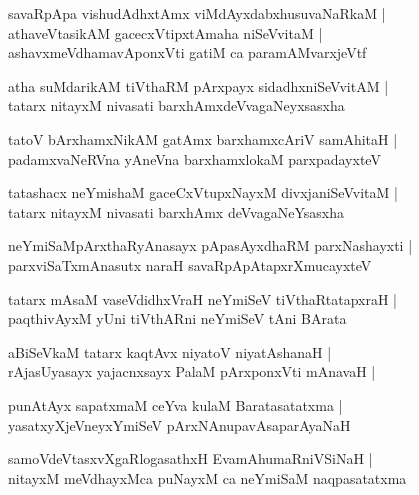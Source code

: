 \documentclass[twoside,12pt,openright]{book}
\newcounter{shloka}[chapter]
\begin{document}
\begin{shloka}
savaRpApa vishudAdhxtAmx viMdAyxdabxhusuvaNaRkaM |\\
athaveVtasikAM gacecxVtipxtAmaha niSeVvitaM |\\
ashavxmeVdhamavAponxVti gatiM  ca paramAMvarxjeVtf 
\end{shloka}

\begin{shloka}
atha suMdarikAM tiVthaRM pArxpayx sidadhxniSeVvitAM |\\
tatarx nitayxM nivasati barxhAmxdeVvagaNeyxsasxha 
\end{shloka}

\begin{shloka}
tatoV bArxhamxNikAM gatAmx barxhamxcAriV samAhitaH |\\
padamxvaNeRVna yAneVna barxhamxlokaM parxpadayxteV 
\end{shloka}

\begin{shloka}
tatashacx neYmishaM gaceCxVtupxNayxM divxjaniSeVvitaM |\\
tatarx nitayxM nivasati barxhAmx deVvagaNeYsasxha
\end{shloka}

\begin{shloka}
neYmiSaMpArxthaRyAnasayx pApasAyxdhaRM parxNashayxti |\\
parxviSaTxmAnasutx naraH savaRpApAtapxrXmucayxteV 
\end{shloka}

\begin{shloka}
tatarx mAsaM vaseVdidhxVraH neYmiSeV tiVthaRtatapxraH |\\
paqthivAyxM yUni tiVthARni neYmiSeV tAni BArata
\end{shloka}

\begin{shloka}
aBiSeVkaM tatarx kaqtAvx niyatoV niyatAshanaH |\\
rAjasUyasayx yajacnxsayx PalaM pArxponxVti mAnavaH |\\
\end{shloka}

\begin{shloka}
punAtAyx sapatxmaM ceYva kulaM Baratasatatxma |\\
yasatxyXjeVneyxYmiSeV pArxNAnupavAsaparAyaNaH 
\end{shloka}

\begin{shloka}
samoVdeVtasxvXgaRlogasathxH EvamAhumaRniVSiNaH |\\
nitayxM meVdhayxMca puNayxM ca neYmiSaM naqpasatatxma
\end{shloka}
\end{document}
